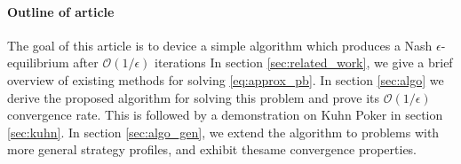 \documentclass{article} %
\begin{document}
\paragraph{Outline of article}
The goal of this article is to device a simple algorithm which produces a Nash $\epsilon$-equilibrium after $\mathcal{O}(1/\epsilon)$ iterations%
In section \ref{sec:related_work}, we give a brief overview of existing methods for solving \eqref{eq:approx_pb}. In section \ref{sec:algo} we derive the proposed algorithm for solving this problem and prove its $\mathcal{O}(1/\epsilon)$ convergence rate.  This is followed by a demonstration on Kuhn Poker in section \ref{sec:kuhn}. In section \ref{sec:algo_gen}, we extend  the algorithm to problems with more general strategy profiles, and exhibit thesame convergence properties.


\end{document}
